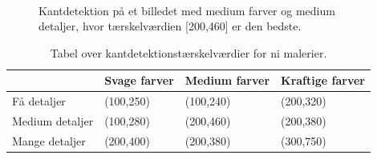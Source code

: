 \begin{figure}[!h]
    \centering
    \\

        \caption[]{Kantdetektion på et billedet med medium farver og
		medium detaljer, hvor tærskelværdien [200,460] er den bedste.}
     \label{tre}
\end{figure}

\begin{table}[!h]
    \centering
    \begin{tabular}{| l | l | l | l |} \hline
        & Svage farver 	& Medium farver & Kraftige farver \\ \hline
        Få detaljer 		& (100,250)		& (100,240)		& (200,320)\\ \hline
        Medium detaljer 	& (100,280)		& (200,460)		& (200,380)\\ \hline
        Mange detaljer		& (200,400)		& (200,380)		& (300,750)\\ \hline
    \end{tabular}
    \caption{Tabel over kantdetektionstærskelværdier for ni malerier.}
    \label{thressholdsTabelKant}
\end{table}

